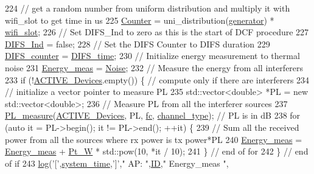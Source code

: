 \begin{DoxyCode}
224             \textcolor{comment}{// get a random number from uniform distribution and multiply it with wifi\_slot to get time in
       us}
225             \hyperlink{classAP_a4cf433d4becdf9cb836d170133d9d478}{Counter} = uni\_distribution(\hyperlink{classAP_adbc9c4c803b5a61b33b6199e1364fb94}{generator}) * \hyperlink{classAP_a48aa019a03aefd3ee980a9112441234b}{wifi\_slot};
226             \textcolor{comment}{// Set DIFS\_Ind to zero as this is the start of DCF procedure}
227             \hyperlink{classAP_ae9749297d96e52a95a4f52f795127f8e}{DIFS\_Ind} = \textcolor{keyword}{false};
228             \textcolor{comment}{// Set the DIFS Counter to DIFS duration}
229             \hyperlink{classAP_ae8b5098c1fed76aeecdb1ed35f8952a1}{DIFS\_counter} = \hyperlink{classAP_a41453568719c530c6a7376273c02a6fa}{DIFS\_time};
230             \textcolor{comment}{// Initialize energy measurement to thermal noise}
231             \hyperlink{classAP_a71f625e0df8f494e53ab6e27a2e96bd9}{Energy\_meas} = \hyperlink{classAP_ae865c89ed6f1bace113d6ddb1a4f41d3}{Noise};
232             \textcolor{comment}{// Measure the energy from all interferers}
233             \textcolor{keywordflow}{if} (!\hyperlink{classAP_ab6dd8d2144b1be8dea239c3d76fc60cd}{ACTIVE\_Devices}.empty()) \{ \textcolor{comment}{// compute only if there are interferers}
234                 \textcolor{comment}{// initialize a vector pointer to measure PL}
235                 std::vector<double> *PL = \textcolor{keyword}{new} std::vector<double>;
236                 \textcolor{comment}{// Measure PL from all the interferer sources}
237                 \hyperlink{PL__measure_8cpp_afb433c5f099becf495d3c9d29ffc707d}{PL\_measure}(\hyperlink{classAP_ab6dd8d2144b1be8dea239c3d76fc60cd}{ACTIVE\_Devices}, PL, \hyperlink{classAP_af7f928faaa72cbfe5c4f905cb146a564}{fc}, 
      \hyperlink{classAP_a334f5b7be9725824797db57032de80e2}{channel\_type}); \textcolor{comment}{// PL is in dB}
238                 \textcolor{keywordflow}{for} (\textcolor{keyword}{auto} it = PL->begin(); it != PL->end(); ++it) \{
239                     \textcolor{comment}{// Sum all the received power from all the sources where rx power is tx power*PL}
240                     \hyperlink{classAP_a71f625e0df8f494e53ab6e27a2e96bd9}{Energy\_meas} = \hyperlink{classAP_a71f625e0df8f494e53ab6e27a2e96bd9}{Energy\_meas} + \hyperlink{classAP_a10998008dbe6e924211af8d9ee155534}{Pt\_W} * std::pow(10, *it / 10);
241                 \} \textcolor{comment}{// end of for}
242             \} \textcolor{comment}{// end of if}
243             \hyperlink{AP_8cpp_aa5af53510557e77a03906c5016ebe66f}{log}(\textcolor{charliteral}{'['},\hyperlink{AP_8cpp_aaa03a568dc1d9d3391286ea24b9cfb63}{system\_time},\textcolor{charliteral}{']'},\textcolor{stringliteral}{" AP: "},\hyperlink{classAP_a5f6f67357a37b369b8967ce354ede5dd}{ID},\textcolor{stringliteral}{" Energy\_meas "},

\end{DoxyCode}
